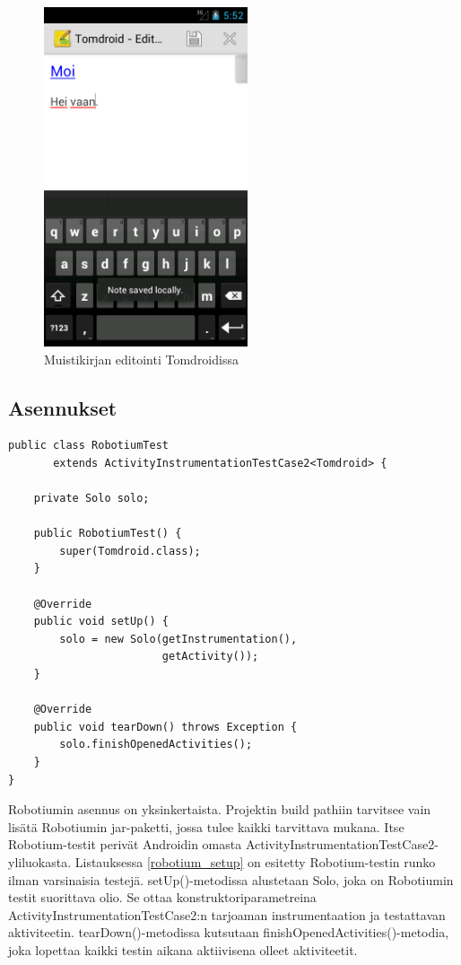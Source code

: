 \begin{figure}[htb]
\includegraphics[width=60mm]{tomdroid_editview.png}
\caption{Muistikirjan editointi Tomdroidissa} \label{tomdroid_editview}
\end{figure}

\subsection{Asennukset}

\begin{lstlisting}[float,label=robotium_setup,caption=Robotium-testirunko]
public class RobotiumTest 
       extends ActivityInstrumentationTestCase2<Tomdroid> {

	private Solo solo;
	
	public RobotiumTest() {
		super(Tomdroid.class);
	}
	
	@Override
	public void setUp() {
		solo = new Solo(getInstrumentation(), 
		                getActivity());
	}
	
	@Override
	public void tearDown() throws Exception {
		solo.finishOpenedActivities();
	}
}
\end{lstlisting}

Robotiumin asennus on yksinkertaista. Projektin build pathiin tarvitsee vain lisätä Robotiumin jar-paketti, jossa tulee kaikki tarvittava mukana. Itse Robotium-testit perivät Androidin omasta ActivityInstrumentationTestCase2-yliluokasta. Listauksessa \ref{robotium_setup} on esitetty Robotium-testin runko ilman varsinaisia testejä. setUp()-metodissa alustetaan Solo, joka on Robotiumin testit suorittava olio. Se ottaa konstruktoriparametreina ActivityInstrumentationTestCase2:n tarjoaman instrumentaation ja testattavan aktiviteetin. tearDown()-metodissa kutsutaan finishOpenedActivities()-metodia, joka lopettaa kaikki testin aikana aktiivisena olleet aktiviteetit.

